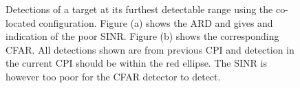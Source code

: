 \documentclass[english, 12pt]{report}
\begin{document}
\begin{figure}[ht]
\centering
{}
\hfill
{}
\hfill
\caption[Detections of a target at its furthest detectable range using the co-located configuration.]{Detections of a target at its furthest detectable range using the co-located configuration. Figure (a) shows the ARD and gives and indication of the poor SINR. Figure (b) shows the corresponding CFAR. All detections shown are from previous CPI and detection in the current CPI should be within the red ellipse. The SINR is however too poor for the CFAR detector to detect.}
\label{fig:DetectionRangeColocated}
\end{figure}
\end{document}

